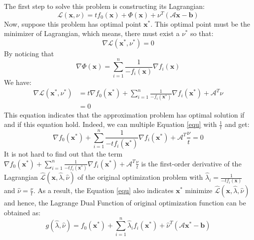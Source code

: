 \documentclass[10pt,a4paper]{article}
\begin{document}
The first step to solve this problem is constructing its Lagrangian:
\begin{equation*}
	\mathcal{L}(\mathbf{x}, \nu) = t f_{0}(\mathbf{x}) + \Phi(\mathbf{x}) + \nu^{T}(\mathcal{A} \mathbf{x} - \mathbf{b})
\end{equation*}
Now, suppose this problem has optimal point $\mathbf{x^{*}}$. This optimal point must be the minimizer of Lagrangian, which means, there must exist a $\nu^{*}$ so that:
\begin{equation*}
	\nabla \mathcal{L}(\mathbf{x}^{*}, \nu^{*}) = 0
\end{equation*}
By noticing that
\begin{equation*}
	\nabla \Phi(\mathbf{x}) = \displaystyle\sum_{i = 1}^{n} \frac{1}{-f_{i}(\mathbf{x})} \nabla f_{i}(\mathbf{x})
\end{equation*}
We have:
\begin{equation}
	\begin{aligned}
		\nabla \mathcal{L}(\mathbf{x}^{*}, \nu^{*}) & = t \nabla f_{0}(\mathbf{x^{*}}) + \displaystyle\sum_{i = 1}^{n} \frac{1}{-f_{i}(\mathbf{x^{*}})} \nabla f_{i}(\mathbf{x^{*}}) + \mathcal{A}^{T} \nu \\
		& = 0
	\end{aligned}
	\label{equ}
\end{equation}
This equation indicates that the approximation problem has optimal solution if and if this equation hold. Indeed, we can multiple Equation \ref{equ} with $\frac{1}{t}$ and get:
\begin{equation*}
	\nabla f_{0}(\mathbf{x^{*}}) + \displaystyle\sum_{i = 1}^{n} \frac{1}{-t f_{i}(\mathbf{x^{*}})} \nabla f_{i}(\mathbf{x^{*}}) + \mathcal{A}^{T} \frac{\nu}{t} = 0
\end{equation*}
It is not hard to find out that the term $\nabla f_{0}(\mathbf{x^{*}}) + \displaystyle\sum_{i = 1}^{n} \frac{1}{-t f_{i}(\mathbf{x^{*}})} \nabla f_{i}(\mathbf{x^{*}}) + \mathcal{A}^{T} \frac{\nu}{t}$ is the first-order derivative of the Lagrangian $\hat{\mathcal{L}}(\mathbf{x}, \hat{\lambda}, \hat{\nu})$ of the original optimization problem with $\hat{\lambda}_{i} = \frac{1}{-tf_{i}(\mathbf{x})}$ and $\hat{\nu} = \frac{\nu}{t}$. As a result, the Equation \ref{equ} also indicates $\mathbf{x^{*}}$ minimize $\hat{\mathcal{L}}(\mathbf{x},  \hat{\lambda}, \hat{\nu})$ and hence, the Lagrange Dual Function of original optimization function can be obtained as:
\begin{equation*}
	g(\hat{\lambda}, \hat{\nu}) = f_{0}(\mathbf{x^{*}}) + \displaystyle\sum_{i = 1}^{n} \hat{\lambda}_{i} f_{i}(\mathbf{x^{*}}) + \hat{\nu}^{T} (\mathcal{A} \mathbf{x}^{*} - \mathbf{b})
\end{equation*}
\end{document}
